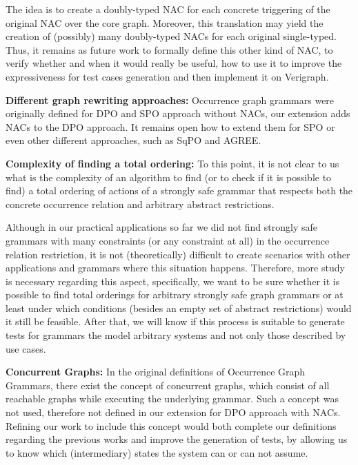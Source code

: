 The idea is to create a doubly-typed NAC for each concrete triggering of the original NAC over the core graph. Moreover, this translation may yield the creation of (possibly) many doubly-typed NACs for each original single-typed. Thus, it remains as future work to formally define this other kind of NAC, to verify whether and when it would really be useful, how to use it to improve the expressiveness for test cases generation and then implement it on Verigraph.


\textbf{Different graph rewriting approaches:} Occurrence graph grammars were originally defined for DPO and SPO approach without NACs, our extension adds NACs to the DPO approach. It remains open how to extend them for SPO or even other different approaches, such as SqPO and AGREE.

\textbf{Complexity of finding a total ordering:} To this point, it is not clear to us what is the complexity of an algorithm to find (or to check if it is possible to find) a total ordering of actions of a strongly safe grammar that respects both the concrete occurrence relation and arbitrary abstract restrictions.

  Although in our practical applications so far we did not find strongly safe grammars with many constraints (or any constraint at all) in the occurrence relation restriction, it is not (theoretically) difficult to create scenarios with other applications and grammars where this situation happens. Therefore, more study is necessary regarding this aspect, specifically, we want to be sure whether it is possible to find total orderings for arbitrary strongly safe graph grammars or at least under which conditions
  (besides an empty set of abstract restrictions) would it still be feasible. After that, we will know if this process is suitable to generate tests for grammars the model arbitrary systems and not only those described by use cases.

\textbf{Concurrent Graphs:} In the original definitions of Occurrence Graph Grammars, there exist the concept of concurrent graphs, which consist of all reachable graphs while executing the underlying grammar. Such a concept was not used, therefore not defined in our extension for DPO approach with NACs. Refining our work to include this concept would both complete our definitions regarding the previous works and improve the generation of tests, by allowing us to know which (intermediary) states the system can or can not assume.

